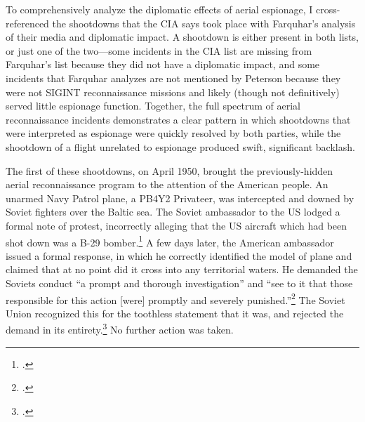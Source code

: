 \documentclass[14pt]{extarticle}
\begin{document}
To comprehensively analyze the diplomatic effects of aerial espionage, I cross-referenced the shootdowns that the CIA says took place with Farquhar's analysis of their media and diplomatic impact. A shootdown is either present in both lists, or just one of the two---some incidents in the CIA list are missing from Farquhar's list because they did not have a diplomatic impact, and some incidents that Farquhar analyzes are not mentioned by Peterson because they were not SIGINT reconnaissance missions and likely (though not definitively) served little espionage function. Together, the full spectrum of aerial reconnaissance incidents demonstrates a clear pattern in which shootdowns that were interpreted as espionage were quickly resolved by both parties, while the shootdown of a flight unrelated to espionage produced swift, significant backlash.

The first of these shootdowns, on April 1950, brought the previously-hidden aerial reconnaissance program to the attention of the American people. An unarmed Navy Patrol plane, a PB4Y2 Privateer, was intercepted and downed by Soviet fighters over the Baltic sea. The Soviet ambassador to the US lodged a formal note of protest, incorrectly alleging that the US aircraft which had been shot down was a B-29 bomber.\footcite{kirk_ambassador_1950} A few days later, the American ambassador issued a formal response, in which he correctly identified the model of plane and claimed that at no point did it cross into any territorial waters. He demanded the Soviets conduct \enquote{a prompt and thorough investigation} and \enquote{see to it that those responsible for this action [were] promptly and severely punished.}\footcite{the_associated_press_text_1950} The Soviet Union recognized this for the toothless statement that it was, and rejected the demand in its entirety.\footcite{salisbury_kremlin_1950} No further action was taken.
\end{document}
